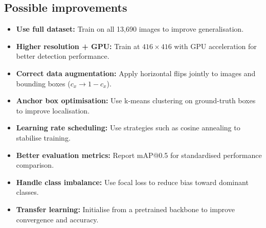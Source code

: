 \documentclass[10pt, a4paper]{article}
\begin{document}
\subsection{Possible improvements}

\begin{itemize}
	\item \textbf{Use full dataset:} Train on all 13,690 images to improve generalisation.
	
	\item \textbf{Higher resolution + GPU:} Train at $416\times416$ with GPU acceleration for better detection performance.
	
	\item \textbf{Correct data augmentation:} Apply horizontal flips jointly to images and bounding boxes ($c_x \rightarrow 1 - c_x$).
	
	\item \textbf{Anchor box optimisation:} Use k-means clustering on ground-truth boxes to improve localisation.
	
	\item \textbf{Learning rate scheduling:} Use strategies such as cosine annealing to stabilise training.
	
	\item \textbf{Better evaluation metrics:} Report mAP@0.5 for standardised performance comparison.
	
	\item \textbf{Handle class imbalance:} Use focal loss to reduce bias toward dominant classes.
	
	\item \textbf{Transfer learning:} Initialise from a pretrained backbone to improve convergence and accuracy.
\end{itemize}
\end{document}
